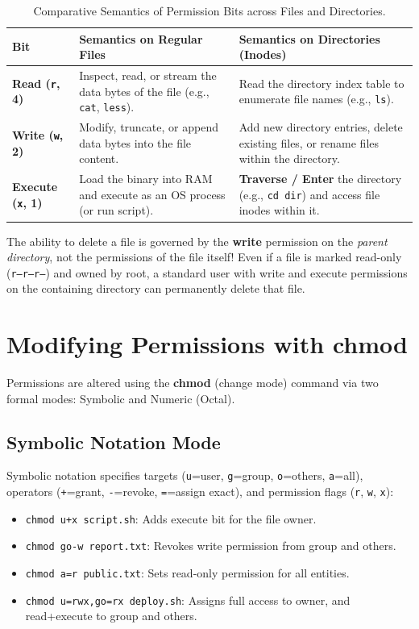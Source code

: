 \begin{table}[htbp]
\centering
\small
\begin{tabularx}{\linewidth}{l X X}
\toprule
\textbf{Bit} & \textbf{Semantics on Regular Files} & \textbf{Semantics on Directories (Inodes)} \\
\midrule
\textbf{Read (\texttt{r}, 4)} & Inspect, read, or stream the data bytes of the file (e.g., \texttt{cat}, \texttt{less}). & Read the directory index table to enumerate file names (e.g., \texttt{ls}). \\
\textbf{Write (\texttt{w}, 2)} & Modify, truncate, or append data bytes into the file content. & Add new directory entries, delete existing files, or rename files within the directory. \\
\textbf{Execute (\texttt{x}, 1)} & Load the binary into RAM and execute as an OS process (or run script). & \textbf{Traverse / Enter} the directory (e.g., \texttt{cd dir}) and access file inodes within it. \\
\bottomrule
\end{tabularx}
\caption{Comparative Semantics of Permission Bits across Files and Directories.}
\label{tab:perm-semantics}
\end{table}

\begin{warningbox}
The ability to delete a file is governed by the \textbf{write} permission on the \textit{parent directory}, not the permissions of the file itself! Even if a file is marked read-only (\texttt{r--r--r--}) and owned by root, a standard user with write and execute permissions on the containing directory can permanently delete that file.
\end{warningbox}

\section{Modifying Permissions with chmod}
Permissions are altered using the \textbf{chmod} (change mode) command via two formal modes: Symbolic and Numeric (Octal).

\subsection{Symbolic Notation Mode}
Symbolic notation specifies targets (\texttt{u}=user, \texttt{g}=group, \texttt{o}=others, \texttt{a}=all), operators (\texttt{+}=grant, \texttt{-}=revoke, \texttt{=}=assign exact), and permission flags (\texttt{r}, \texttt{w}, \texttt{x}):
\begin{itemize}[leftmargin=1.5em]
    \item \texttt{chmod u+x script.sh}: Adds execute bit for the file owner.
    \item \texttt{chmod go-w report.txt}: Revokes write permission from group and others.
    \item \texttt{chmod a=r public.txt}: Sets read-only permission for all entities.
    \item \texttt{chmod u=rwx,go=rx deploy.sh}: Assigns full access to owner, and read+execute to group and others.
\end{itemize}

